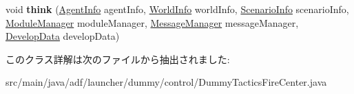 \begin{DoxyCompactItemize}
\item 
\hypertarget{classadf_1_1launcher_1_1dummy_1_1control_1_1DummyTacticsFireCenter_aa34ce41957683fc6f8b2c1ec17034f16}{}\label{classadf_1_1launcher_1_1dummy_1_1control_1_1DummyTacticsFireCenter_aa34ce41957683fc6f8b2c1ec17034f16} 
void {\bfseries think} (\hyperlink{classadf_1_1agent_1_1info_1_1AgentInfo}{Agent\+Info} agent\+Info, \hyperlink{classadf_1_1agent_1_1info_1_1WorldInfo}{World\+Info} world\+Info, \hyperlink{classadf_1_1agent_1_1info_1_1ScenarioInfo}{Scenario\+Info} scenario\+Info, \hyperlink{classadf_1_1agent_1_1module_1_1ModuleManager}{Module\+Manager} module\+Manager, \hyperlink{classadf_1_1agent_1_1communication_1_1MessageManager}{Message\+Manager} message\+Manager, \hyperlink{classadf_1_1agent_1_1develop_1_1DevelopData}{Develop\+Data} develop\+Data)
\end{DoxyCompactItemize}


このクラス詳解は次のファイルから抽出されました\+:\begin{DoxyCompactItemize}
\item 
src/main/java/adf/launcher/dummy/control/Dummy\+Tactics\+Fire\+Center.\+java\end{DoxyCompactItemize}

